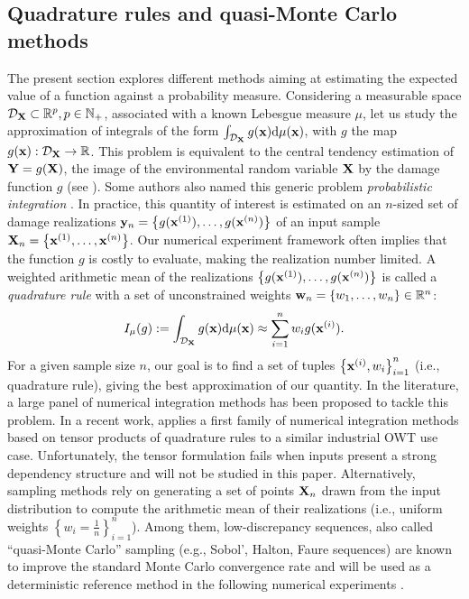 \subsection{Quadrature rules and quasi-Monte Carlo methods}
The present section explores different methods aiming at estimating the expected value of a function against a probability measure. 
Considering a measurable space $\mathcal{D}_{\bf X} \subset \mathbb{R}^p, p \in \mathbb{N}_+$, associated with a known Lebesgue measure $\mu$, let us study the approximation of integrals of the form $\int_{\mathcal{D}_{\bf X}} g({\bf x}) \mathrm{d}\mu({\bf x})$, with $g$ the map $g({\bf x}): \mathcal{D}_{\bf X} \to \mathbb{R}$. 
This problem is equivalent to the central tendency estimation of ${\bf Y} = g({\bf X})$, the image of the environmental random variable ${\bf X}$ by the damage function $g$ (see ). 
Some authors also named this generic problem \emph{probabilistic integration} \citep{briol_oates_2019}. 
In practice, this quantity of interest is estimated on an $n$-sized set of damage realizations ${\bf y}_n = \left\{g({\bf x}^{(1)}), \dots, g({\bf x}^{(n)})\right\}$ of an input sample ${\bf X}_n = \left\{{\bf x}^{(1)}, \dots, {\bf x}^{(n)}\right\}$. 
Our numerical experiment framework often implies that the function $g$ is costly to evaluate, making the realization number limited. 
A weighted arithmetic mean of the realizations $\left\{g({\bf x}^{(1)}), \dots, g({\bf x}^{(n)})\right\}$ is called a \emph{quadrature rule} with a set of unconstrained weights ${\bf w}_n = \{w_1, \dots, w_n\} \in \mathbb{R}^n$:
\begin{equation}
    I_{\mu}(g) := \int_{\mathcal{D}_{\bf X}} g({\bf x}) \mathrm{d}\mu({\bf x}) \approx \sum_{i=1}^n w_i g({\bf x}^{(i)}).
    \label{eq:quadrature_rule}
\end{equation}
For a given sample size $n$, our goal is to find a set of tuples $\left\{{\bf x}^{(i)}, w_i \right\}_{i=1}^n$ (i.e., quadrature rule), giving the best approximation of our quantity. 
In the literature, a large panel of numerical integration methods has been proposed to tackle this problem. 
In a recent work, \cite{bos_2020} applies a first family of numerical integration methods based on tensor products of quadrature rules to a similar industrial OWT use case. 
Unfortunately, the tensor formulation fails when inputs present a strong dependency structure and will not be studied in this paper. 
Alternatively, sampling methods rely on generating a set of points ${\bf X}_n$ drawn from the input distribution to compute the arithmetic mean of their realizations (i.e., uniform weights $\left\{w_i = \frac1n \right\}_{i=1}^n$). 
Among them, low-discrepancy sequences, also called ``quasi-Monte Carlo'' sampling (e.g., Sobol', Halton, Faure sequences) are known to improve the standard Monte Carlo convergence rate and will be used as a deterministic reference method in the following numerical experiments \citep{morokoff_1995}.

